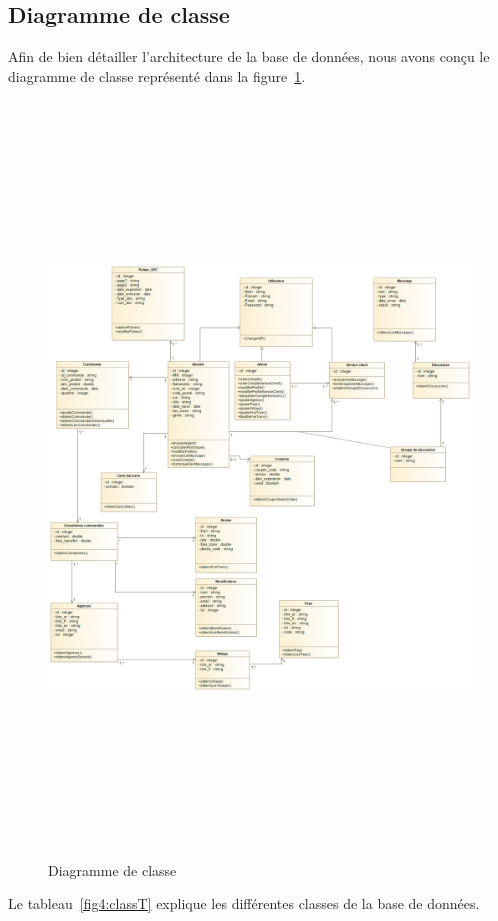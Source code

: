 \subsection{Diagramme de classe}
Afin de bien détailler l’architecture de la base de données, nous avons conçu le diagramme de
classe représenté dans la figure~\ref{fig4:class}.
\begin{figure}[h!]
	\includegraphics[width=18cm, height=20cm]{./Template LaTeX/Images/Diagramme_de_classe_V3.png}
	\caption{Diagramme de classe}
	\label{fig4:class}
\end{figure}
\newpage
\hspace*{-2cm} Le tableau~\ref{fig4:classT} explique les différentes classes de la base de données.
